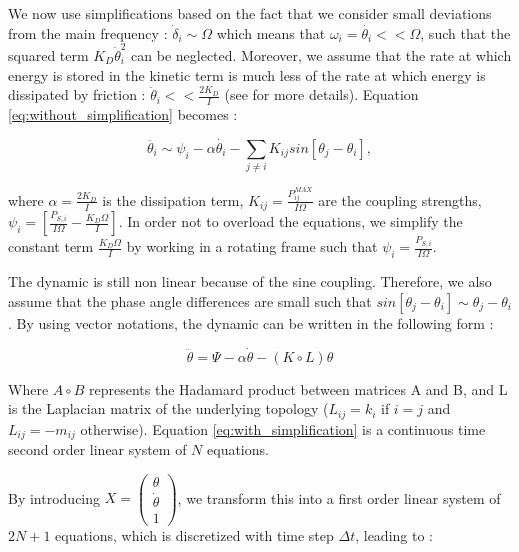 \documentclass[conference]{IEEEtran}
\begin{document}
We now use simplifications based on the fact that we consider small deviations from the main frequency : $ \dot{ \delta}_i \sim \Omega $ which means that $ \omega_i = \dot{\theta_i} << \Omega $, such that the squared term $ K_D \dot{\theta}_i^2 $ can be neglected.
Moreover, we assume that the rate at which energy is stored in the kinetic term is much less of the rate at which energy is dissipated by friction : $ \ddot{ \theta }_i  << \frac{2 K_D}{I} $ (see \cite{Filatrella2008} for more details). Equation \ref{eq:without_simplification} becomes :

\begin{equation}
 \ddot{ \theta_i } \sim \psi_i - \alpha \dot{ \theta_i } - \sum_{j\neq i} K_{ij} sin \left[ \theta_j - \theta_i \right],
\end{equation}

\noindent where $ \alpha = \frac{2 K_D}{I} $ is the dissipation term, $ K_{ij} = \frac{P_{ij}^{MAX}}{I \Omega} $ are the coupling strengths, $ \psi_i = \left[ \frac{P_{S,i}}{I \Omega} - \frac{K_D \Omega}{I} \right] $. In order not to overload the equations, we simplify the constant term $ \frac{K_D \Omega}{I} $ by working in a rotating frame such that $ \psi_i=\frac{P_{S,i}}{I \Omega} $.

The dynamic is still non linear because of the sine coupling. Therefore, we also assume that the phase angle differences are small such that $ sin \left[ \theta_j - \theta_i \right] \sim \theta_j - \theta_i $. By using vector notations, the dynamic can be written in the following form :

\begin{equation}
\label{eq:with_simplification}
\ddot{\theta} = \Psi - \alpha \dot{\theta} - (K \circ L)\theta
\end{equation}

Where $ A \circ B $ represents the Hadamard product between matrices A and B, and L is the Laplacian matrix of the underlying topology ($L_{ij} = k_i $ if $i=j$ and $L_{ij} = -m_{ij} $ otherwise). Equation \ref{eq:with_simplification} is a continuous time second order linear system of $ N $ equations. 

By introducing $ X = \left( \begin{array}{c} \theta \\ \dot{\theta} \\ 1 \end{array} \right)$, we transform this into a first order linear system of $2N+1$ equations, which is discretized with time step $\Delta t$, leading to : 
\end{document}
